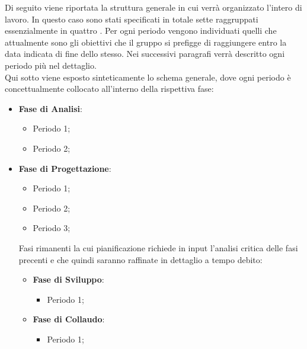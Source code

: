 Di seguito viene riportata la struttura generale in cui verrà organizzato l'intero  di lavoro. In questo caso sono stati specificati in totale sette  raggruppati essenzialmente in quattro . Per ogni periodo vengono individuati quelli che attualmente sono gli obiettivi che il gruppo \Gruppo{} si prefigge di raggiungere entro la data indicata di fine dello stesso. Nei successivi paragrafi verrà descritto ogni periodo più nel dettaglio.\\
Qui sotto viene esposto sinteticamente lo schema generale, dove ogni periodo è concettualmente collocato all'interno della rispettiva fase:

\begin{itemize}
    \item \textbf{Fase di Analisi}:
    \begin{itemize}
        \item Periodo 1;
        \item Periodo 2;
    \end{itemize}

    \item \textbf{Fase di Progettazione}:
    \begin{itemize}
        \item Periodo 1;
        \item Periodo 2;
        \item Periodo 3;
    \end{itemize}
    Fasi rimanenti la cui pianificazione richiede in input l'analisi critica delle fasi precenti
                    e che quindi saranno raffinate in dettaglio a tempo debito:
                    \begin{itemize}

                        \item \textbf{Fase di Sviluppo}:
                        \begin{itemize}  
                            \item Periodo 1;
                        \end{itemize}

                        \item \textbf{Fase di Collaudo}:
                        \begin{itemize}        
                            \item Periodo 1;
                        \end{itemize}
                \end{itemize}
\end{itemize}

